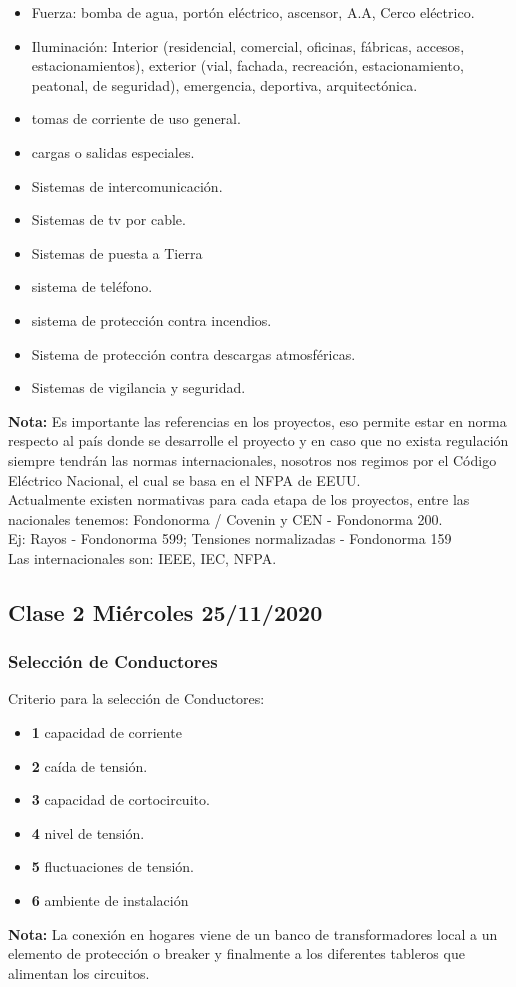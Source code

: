 \documentclass[11pt,letterpaper]{article}
\begin{document}
\begin{itemize}
	\item Fuerza: bomba de agua, portón eléctrico, ascensor, A.A, Cerco eléctrico.
	\item Iluminación: Interior (residencial, comercial, oficinas, fábricas, accesos, estacionamientos),	exterior (vial, fachada, recreación, estacionamiento, peatonal, de seguridad), emergencia, deportiva, arquitectónica.
	\item tomas de corriente de uso general.
	\item cargas o salidas especiales.
	\item Sistemas de intercomunicación.
	\item Sistemas de tv por cable.
	\item Sistemas de puesta a Tierra
	\item sistema de teléfono.
	\item sistema de protección contra incendios.
	\item Sistema de protección contra descargas atmosféricas.
	\item Sistemas de vigilancia y seguridad.
\end{itemize}

\textbf{Nota:} Es importante las referencias en los proyectos, eso permite estar en norma respecto al país donde se desarrolle el proyecto y en caso que no exista regulación siempre tendrán las normas internacionales, nosotros nos regimos por el Código Eléctrico Nacional, el cual se basa en el NFPA de EEUU.\\
Actualmente existen normativas para cada etapa de los proyectos, entre las nacionales tenemos: Fondonorma / Covenin y CEN - Fondonorma 200.\\
Ej: Rayos - Fondonorma 599; Tensiones normalizadas - Fondonorma 159\\

Las internacionales son: IEEE, IEC, NFPA.
\subsection{Clase 2 Miércoles 25/11/2020}
\subsubsection{Selección de Conductores}
Criterio para la selección de Conductores:
\begin{itemize}
	\item \textbf{1} capacidad de corriente
	\item \textbf{2} caída de tensión.
	\item \textbf{3} capacidad de cortocircuito.
	\item \textbf{4} nivel de tensión.
	\item \textbf{5} fluctuaciones de tensión.
	\item \textbf{6} ambiente de instalación
\end{itemize}
\textbf{Nota:} La conexión en hogares viene de un banco de transformadores local a un elemento de protección o breaker y
 finalmente a los diferentes tableros que alimentan los circuitos.\\
 
\end{document}
